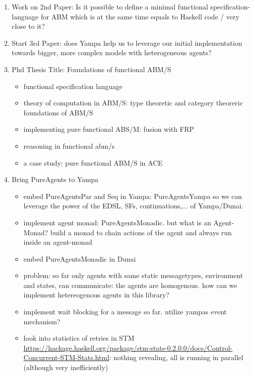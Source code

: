 \begin{enumerate}
\item Work on 2nd Paper: Is it possible to define a minimal functional specification-language for ABM which is at the same time equals to Haskell code / very close to it? 

\item Start 3rd Paper: does Yampa help us to leverage our initial implementation towards bigger, more complex models with heterogeneous agents?

\item Phd Thesis Title: Foundations of functional ABM/S
	\begin{itemize}
		\item functional specification language
		\item theory of computation in ABM/S: type theoretic and category theoreric foundations of ABM/S
		\item implementing pure functional ABS/M: fusion with FRP
		\item reasoning in functional abm/s
		\item a case study: pure functional ABM/S in ACE
	\end{itemize}

\item Bring PureAgents to Yampa
	\begin{itemize}
		\item embed PureAgentsPar and Seq in Yampa: PureAgentsYampa so we can leverage the power of the EDSL, SFs, continuations,... of Yampa/Dunai.
		\item implement agent monad: PureAgentsMonadic. but what is an Agent-Monad? build a monad to chain actions of the agent and always run inside an agent-monad
		\item embed PureAgentsMonadic in Dunai
		\item problem: so far only agents with same static messagetypes, environment and states, can communicate: the agents are homogenous. how can we implement hetereogenous agents in this library?
		\item implement wait blocking for a message so far. utilize yampas event mechanism?
		\item look into statistics of retries in STM \url{https://hackage.haskell.org/package/stm-stats-0.2.0.0/docs/Control-Concurrent-STM-Stats.html}: nothing revealing, all is running in parallel (although very inefficiently)
	\end{itemize}


\end{enumerate}
